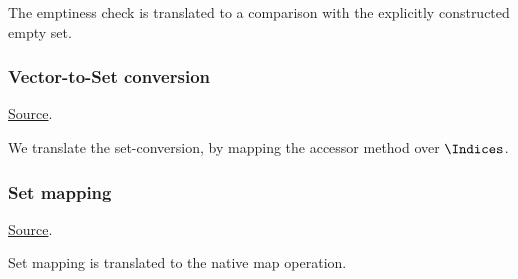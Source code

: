 \begin{mathpar}
\end{mathpar}
The emptiness check is translated to a comparison with the explicitly constructed empty set.

\subsubsection{ Vector-to-Set conversion}
\href{https://github.com/saltiniroberto/ssf/blob/7ea6e18093d9da3154b4e396dd435549f687e6b9/high_level/common/pythonic_code_generic.py#L87-L88}{Source}.



\begin{mathpar}
\end{mathpar}
We translate the set-conversion, by mapping the accessor method over $\Indices$.

\subsubsection{ Set mapping}
\href{https://github.com/saltiniroberto/ssf/blob/7ea6e18093d9da3154b4e396dd435549f687e6b9/high_level/common/pythonic_code_generic.py#L91-L97}{Source}.



\begin{mathpar}
\end{mathpar}
Set mapping is translated to the \tlap{} native map operation.

